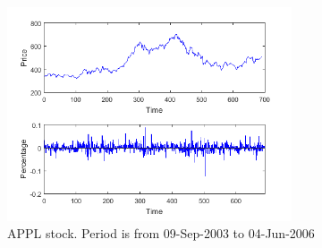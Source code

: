 \documentclass[11pt,a4,twosided,singlespacing,titlepagenumber=on]{scrreprt}
\numberwithin{equation}{chapter} %
\theoremstyle{remark}
\begin{document}
\begin{figure}[htb]
\centering
\includegraphics[width = 0.75\textwidth]{apple_2003_2006}
\caption{APPL stock. Period is from 09-Sep-2003 to 04-Jun-2006}
\label{apple_2003_2006}
\end{figure}
\end{document}
